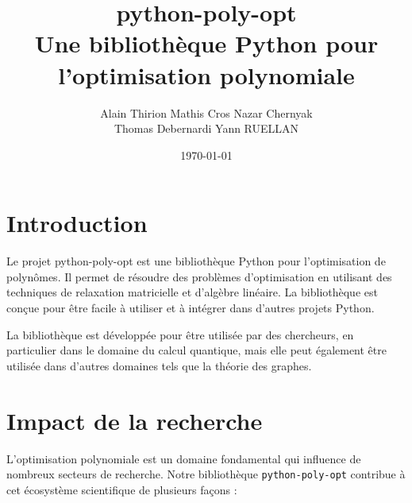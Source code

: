 \documentclass[11pt,a4paper]{article}
\title{
  \textbf{python-poly-opt} \\
  \large{Une bibliothèque Python pour l'optimisation polynomiale}
}
\author{
    Alain Thirion \quad
    Mathis Cros \quad
    Nazar Chernyak \\
    Thomas Debernardi \quad
    Yann RUELLAN
}
\date{\today}
\begin{document}
\maketitle


\section{Introduction}


Le projet python-poly-opt est une bibliothèque Python pour l'optimisation de polynômes. Il permet de résoudre des problèmes d'optimisation en utilisant des techniques de relaxation matricielle et d'algèbre linéaire. La bibliothèque est conçue pour être facile à utiliser et à intégrer dans d'autres projets Python.

La bibliothèque est développée pour être utilisée par des chercheurs, en particulier dans le domaine du calcul quantique, mais elle peut également être utilisée dans d'autres domaines tels que la théorie des graphes. 

\section{Impact de la recherche}

L'optimisation polynomiale est un domaine fondamental qui influence de nombreux secteurs de recherche. Notre bibliothèque \texttt{python-poly-opt} contribue à cet écosystème scientifique de plusieurs façons :
\end{document}
